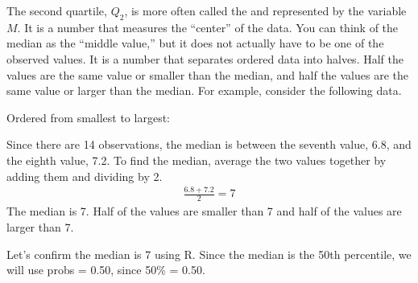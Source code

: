 \documentclass[letterpaper,10pt,english]{jupyterBook}
\begin{document}
\sphinxAtStartPar
The second quartile, \(Q_2\), is more often called the  and represented by the variable \(M\). It is a number that measures the “center” of the data. You can think of the median as the “middle value,” but it does not actually have to be one of the observed values. It is a number that separates ordered data into halves. Half the values are the same value or smaller than the median, and half the values are the same value or larger than the median. For example, consider the following data.



\sphinxAtStartPar
Ordered from smallest to largest:



\sphinxAtStartPar
Since there are 14 observations, the median is between the seventh value, 6.8, and the eighth value, 7.2. To find the median, average the two values together by adding them and dividing by 2.
\begin{equation*}
\begin{split}\frac{6.8 + 7.2}{2} = 7\end{split}
\end{equation*}
\sphinxAtStartPar
The median is 7. Half of the values are smaller than 7 and half of the values are larger than 7.

\sphinxAtStartPar
Let’s confirm the median is 7 using R. Since the median is the 50th percentile, we will use probs = 0.50, since 50\% = 0.50.
\end{document}
